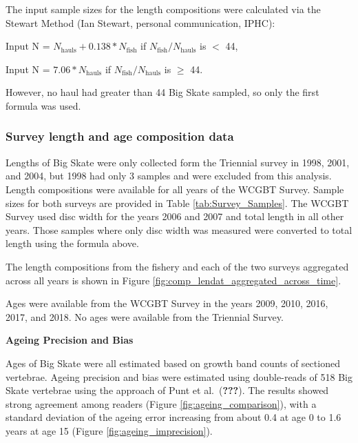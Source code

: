 \documentclass[12pt,]{article}
\begin{document}
The input sample sizes for the length compositions were calculated via
the Stewart Method (Ian Stewart, personal communication, IPHC):

\begin{centering}

Input N = $N_{\text{hauls}} + 0.138 * N_{\text{fish}}$ if $N_{\text{fish}}/N_{\text{hauls}}$ is $<$ 44,

Input N = $7.06 * N_{\text{hauls}}$ if $N_{\text{fish}}/N_{\text{hauls}}$ is $\geq$ 44.

\end{centering}

However, no haul had greater than 44 Big Skate sampled, so only the
first formula was used.

\hypertarget{survey-length-and-age-composition-data}{%
\subsubsection{Survey length and age composition
data}\label{survey-length-and-age-composition-data}}

Lengths of Big Skate were only collected form the Triennial survey in
1998, 2001, and 2004, but 1998 had only 3 samples and were excluded from
this analysis. Length compositions were available for all years of the
WCGBT Survey. Sample sizes for both surveys are provided in Table
\ref{tab:Survey_Samples}. The WCGBT Survey used disc width for the years
2006 and 2007 and total length in all other years. Those samples where
only disc width was measured were converted to total length using the
formula above.

The length compositions from the fishery and each of the two surveys
aggregated across all years is shown in Figure
\ref{fig:comp_lendat_aggregated_across_time}.

Ages were available from the WCGBT Survey in the years 2009, 2010, 2016,
2017, and 2018. No ages were available from the Triennial Survey.

\vspace{.5cm}

\textbf{Ageing Precision and Bias}

Ages of Big Skate were all estimated based on growth band counts of
sectioned vertebrae. Ageing precision and bias were estimated using
double-reads of 518 Big Skate vertebrae using the approach of Punt et
al.~({\textbf{???}}). The results showed strong agreement among readers
(Figure \ref{fig:ageing_comparison}), with a standard deviation of the
ageing error increasing from about 0.4 at age 0 to 1.6 years at age 15
(Figure \ref{fig:ageing_imprecision}).
\end{document}
